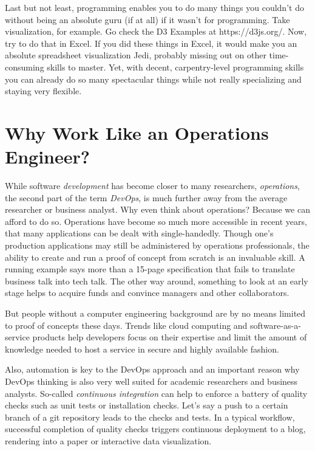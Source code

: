 \documentclass[
  12pt,
  letterpaper,
]{krantz}
\begin{document}
Last but not least, programming enables you to do many things you
couldn't do without being an absolute guru (if at all) if it wasn't for
programming. Take visualization, for example. Go check the D3
Examples at https://d3js.org/. Now, try to do that in Excel. If you did
these things in Excel, it would make you an absolute spreadsheet
visualization Jedi, probably missing out on other time-consuming skills
to master. Yet, with decent, carpentry-level programming skills you can
already do so many spectacular things while not really specializing and
staying very flexible.

\hypertarget{why-work-like-an-operations-engineer}{%
\section{Why Work Like an Operations
Engineer?}\label{why-work-like-an-operations-engineer}}

While software \emph{development} has become closer to many researchers,
\emph{operations}, the second part of the term
\emph{DevOps}, is much further away from the average
researcher or business analyst. Why even think about operations? Because
we can afford to do so. Operations have become so much
more accessible in recent years, that many applications can be dealt
with single-handedly. Though one's production applications may still be
administered by operations professionals, the ability to create and run
a proof of concept from scratch is an invaluable skill. A running
example says more than a 15-page specification that fails to translate
business talk into tech talk. The other way around, something to look at
an early stage helps to acquire funds and convince managers and other
collaborators.

But people without a computer engineering background are by no means
limited to proof of concepts these days. Trends like cloud computing and
software-as-a-service products help developers focus on their expertise
and limit the amount of knowledge needed to host a service in secure and
highly available fashion.

Also, automation is key to the DevOps
approach and an important reason why DevOps thinking is
also very well suited for academic researchers and business analysts.
So-called \emph{continuous integration} can help to enforce a battery of
quality checks such as unit tests or installation checks. Let's say a
push to a certain branch of a git repository leads to the checks and
tests. In a typical workflow, successful completion of quality checks
triggers continuous deployment to a blog, rendering into a paper or
interactive data visualization.
\end{document}
